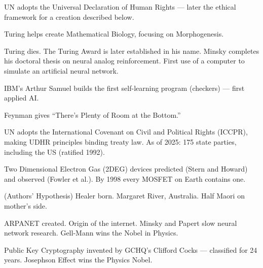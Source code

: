 \begin{description}[style=nextline, leftmargin=3.5cm, labelwidth=3cm]

\item[1948] UN adopts the Universal Declaration of Human Rights --- later the ethical framework for a creation described below.

\item[1952--54] Turing helps create Mathematical Biology, focusing on Morphogenesis.

\item[1954] Turing dies. The Turing Award is later established in his name. Minsky completes his doctoral thesis on neural analog reinforcement. First use of a computer to simulate an artificial neural network.

\item[1956] IBM's Arthur Samuel builds the first self-learning program (checkers) --- first applied AI.

\item[1959] Feynman gives ``There's Plenty of Room at the Bottom.''

\item[1966] UN adopts the International Covenant on Civil and Political Rights (ICCPR), making UDHR principles binding treaty law. As of 2025: 175 state parties, including the US (ratified 1992).

\item[1966--67] Two Dimensional Electron Gas (2DEG) devices predicted (Stern and Howard) and observed (Fowler et al.). By 1998 every MOSFET on Earth contains one.

\item[$\sim$1965] (Authors' Hypothesis) Healer born. Margaret River, Australia. Half Maori on mother's side.

\item[1969] ARPANET created. Origin of the internet. Minsky and Papert slow neural network research. Gell-Mann wins the Nobel in Physics.

\item[1973] Public Key Cryptography invented by GCHQ's Clifford Cocks --- classified for 24 years. Josephson Effect wins the Physics Nobel.


\end{description}
